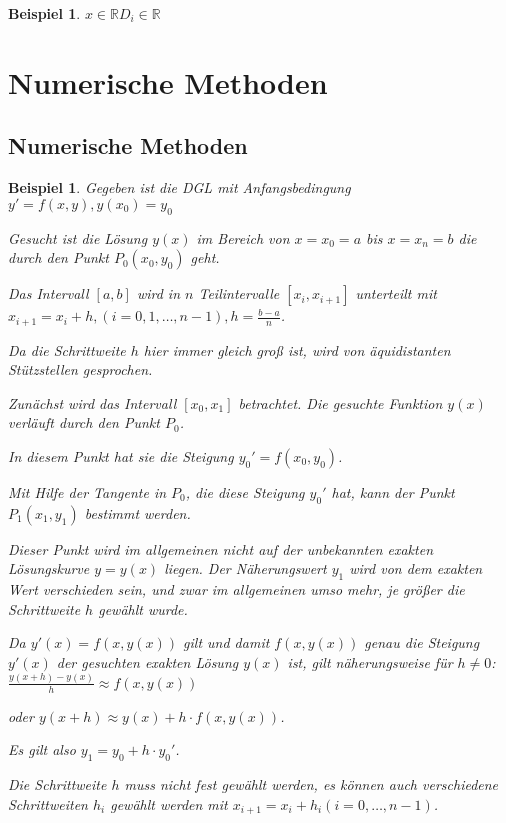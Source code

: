 \documentclass[fontset=ubuntu,11pt,a4paper,fleqn,headsepline]{scrreprt}
\newtheorem{beispiel}[defi]{Beispiel}
\begin{document}
\begin{multicols}{2}
\begin{beispiel}
            \(x\in\mathbb{R} D_i\in\mathbb{R}\)
         \end{beispiel}
    \chapter*{Numerische Methoden}
        \section*{Numerische Methoden}
        \begin{beispiel}
            Gegeben ist die DGL mit Anfangsbedingung \(y'=f(x,y), y(x_0)=y_0\)
         
            Gesucht ist die Lösung \(y(x)\) im Bereich von \(x=x_0=a\) bis \(x=x_n=b\) die durch den Punkt \(P_0(x_0,y_0)\) geht.
    
            Das Intervall \(\left[a,b\right]\) wird in \(n\) Teilintervalle \(\left[x_i,x_{i+1}\right]\) unterteilt mit \(x_{i+1}=x_i+h, (i=0,1,\dots,n-1), h=\frac{b-a}{n}\).

            Da die Schrittweite \(h\) hier immer gleich groß ist, wird von äquidistanten Stützstellen gesprochen.
    
            Zunächst wird das Intervall \(\left[x_0,x_1\right]\) betrachtet. Die gesuchte Funktion \(y(x)\) verläuft durch den Punkt \(P_0\).
    
            In diesem Punkt hat sie die Steigung \(y_0'=f(x_0,y_0)\).
    
            Mit Hilfe der Tangente in \(P_0\), die diese Steigung \(y_0'\) hat, kann der Punkt \(P_1(x_1,y_1)\) bestimmt werden.
    
            Dieser Punkt wird im allgemeinen nicht auf der unbekannten exakten Lösungskurve \(y=y(x)\) liegen. Der Näherungswert \(y_1\) wird von dem exakten Wert verschieden sein, und zwar im allgemeinen umso mehr, je größer die Schrittweite \(h\) gewählt wurde.
    
            Da \(y'(x)=f(x,y(x))\) gilt und damit \(f(x,y(x))\) genau die Steigung \(y'(x)\) der gesuchten exakten Lösung \(y(x)\) ist, gilt näherungsweise für \(h\neq0\): \(\frac{y(x+h)-y(x)}{h}\approx f(x,y(x))\)
            
            oder \(y(x+h)\approx y(x)+h\cdot f(x,y(x))\).
            
            Es gilt also \(y_1=y_0+h\cdot y_0'\).
            
            Die Schrittweite \(h\) muss nicht fest gewählt werden, es können auch verschiedene Schrittweiten \(h_i\) gewählt werden mit \(x_{i+1}=x_i+h_i (i=0,\dots,n-1)\).
        \end{beispiel}
    

\end{multicols}
\end{document}
